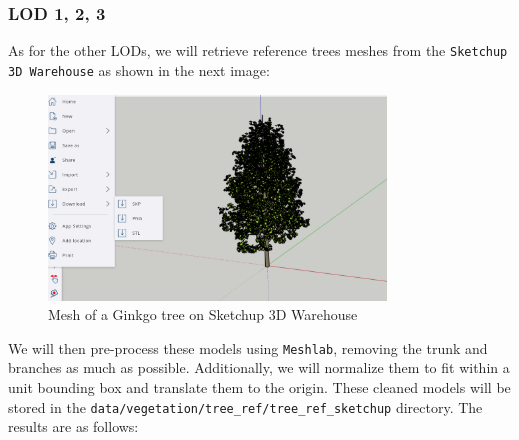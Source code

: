 \documentclass[12pt]{article}
\begin{document}
\subsubsection{LOD 1, 2, 3}
As for the other LODs, we will retrieve reference trees meshes from the
\texttt{Sketchup 3D Warehouse}\cite{sketchup} as shown in the next image:
\begin{figure}[H]
    \centering
        \centering
        \includegraphics[width=0.8\textwidth]{images/ginkgo-sketchup.png}
        \caption{Mesh of a Ginkgo tree on Sketchup 3D Warehouse}
\end{figure}

We will then pre-process these models using \texttt{Meshlab}\cite{meshlab}, removing 
the trunk and branches as much as possible. Additionally, we will normalize them
 to fit within a unit bounding box and translate them to the origin. These cleaned
  models will be stored in the \texttt{data/vegetation/tree\_ref/tree\_ref\_sketchup} directory.
 The results are as follows:
\end{document}
